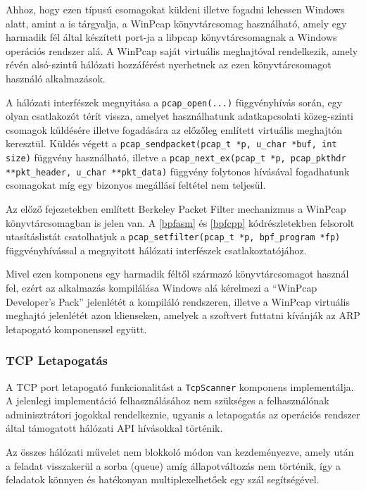 \documentclass[a4paper,12pt]{article}
\begin{document}
	Ahhoz, hogy ezen típusú csomagokat küldeni illetve fogadni lehessen Windows alatt, amint a \cite{xing10} is tárgyalja, a WinPcap könyvtárcsomag használható, amely egy harmadik fél által készített port-ja a libpcap könyvtárcsomagnak a Windows operációs rendszer alá. A WinPcap saját virtuális meghajtóval rendelkezik, amely révén alsó-szintű hálózati hozzáférést nyerhetnek az ezen könyvtárcsomagot használó alkalmazások.
	
	A hálózati interfészek megnyitása a \texttt{pcap_open(...)} függvényhívás során, egy olyan csatlakozót térít vissza, amelyet használhatunk adatkapcsolati közeg-szinti csomagok küldésére illetve fogadására az előzőleg említett virtuális meghajtón keresztül. Küldés végett a \texttt{pcap_sendpacket(pcap_t *p, u_char *buf, int size)} függvény használható, illetve a \texttt{pcap_next_ex(pcap_t *p, pcap_pkthdr **pkt_header, u_char **pkt_data)} függvény folytonos hívásával fogadhatunk csomagokat míg egy bizonyos megállási feltétel nem teljesül.
	
	Az előző fejezetekben említett Berkeley Packet Filter mechanizmus a WinPcap könyvtárcsomagban is jelen van. A \ref{bpfasm} és \ref{bpfcpp} kódrészletekben felsorolt utasításlistát csatolhatjuk a \texttt{pcap_setfilter(pcap_t *p, bpf_program *fp)} függvényhívással a megnyitott hálózati interfészek csatlakoztatójához.
	
	Mivel ezen komponens egy harmadik féltől származó könyvtárcsomagot használ fel, ezért az alkalmazás kompilálása Windows alá kérelmezi a ``WinPcap Developer's Pack'' jelenlétét a kompiláló rendszeren, illetve a WinPcap virtuális meghajtó jelenlétét azon klienseken, amelyek a szoftvert futtatni kívánják az ARP letapogató komponenssel együtt.
	
\subsubsection{TCP Letapogatás} \label{ssec:tcpscan}

	A TCP port letapogató funkcionalitást a \texttt{TcpScanner} komponens implementálja. A jelenlegi implementáció felhasználásához nem szükséges a felhasználónak adminisztrátori jogokkal rendelkeznie, ugyanis a letapogatás az operációs rendszer által támogatott hálózati API hívásokkal történik.
	
	Az összes hálózati művelet nem blokkoló módon van kezdeményezve, amely után a feladat visszakerül a sorba (queue) amíg állapotváltozás nem történik, így a feladatok könnyen és hatékonyan multiplexelhetőek egy szál segítségével.
\end{document}
